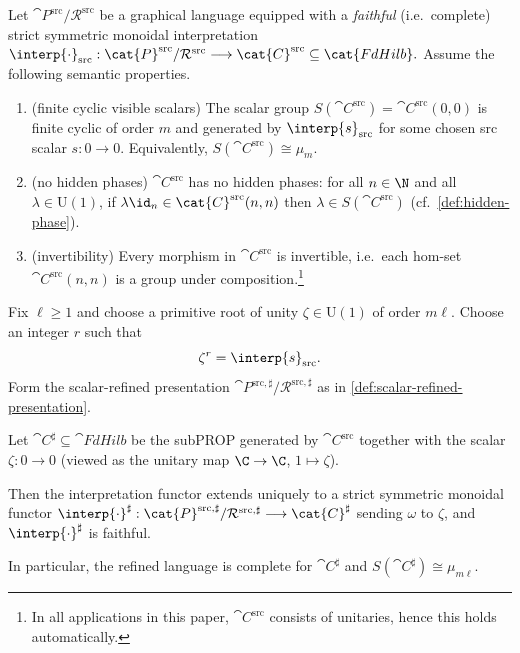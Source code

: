 \begin{lemma}\label{lem:scalar-refinement}
Let $\cat{P}^{\mathrm{src}}/\mathcal{R}^{\mathrm{src}}$ be a graphical language equipped with a
\emph{faithful} (i.e.\ complete) strict symmetric monoidal interpretation
\(
  \interp{\cdot}_{\mathrm{src}} :
  \cat{P}^{\mathrm{src}}/\mathcal{R}^{\mathrm{src}}
  \longrightarrow
   \cat{C}^{\mathrm{src}}
  \subseteq \cat{FdHilb}.
\)
Assume the following semantic properties.
\begin{enumerate}
\item\label{it:scalar-cyclic-app}
(finite cyclic visible scalars)
The scalar group $S( \cat{C}^{\mathrm{src}})= \cat{C}^{\mathrm{src}}(0,0)$ is finite cyclic of order $m$
and generated by $\interp{s}_{\mathrm{src}}$ for some chosen src scalar $s:0\to 0$.
Equivalently, $S( \cat{C}^{\mathrm{src}})\cong \mu_m$.

\item\label{it:no-hidden-phases-app}
(no hidden phases)
$ \cat{C}^{\mathrm{src}}$ has no hidden phases: for all $n\in\N$ and all $\lambda\in\mathrm{U}(1)$,
if $\lambda \id_n\in \cat{C}^{\mathrm{src}}(n,n)$ then $\lambda\in S( \cat{C}^{\mathrm{src}})$
(cf.\ \cref{def:hidden-phase}).

\item\label{it:invertible-app}
(invertibility)
Every morphism in $ \cat{C}^{\mathrm{src}}$ is invertible, i.e.\ each hom-set
$ \cat{C}^{\mathrm{src}}(n,n)$ is a group under composition.\footnote{%
In all applications in this paper, $ \cat{C}^{\mathrm{src}}$ consists of unitaries, hence this holds automatically.}
\end{enumerate}

Fix $\ell\ge 1$ and choose a primitive root of unity $\zeta\in\mathrm{U}(1)$ of order $m\ell$.
Choose an integer $r$ such that
\begin{equation}\label{eq:choose-r}
  \zeta^{r}=\interp{s}_{\mathrm{src}}.
\end{equation}
Form the scalar-refined presentation
$\cat{P}^{\mathrm{src},\sharp}/\mathcal{R}^{\mathrm{src},\sharp}$ as in
\cref{def:scalar-refined-presentation}.

Let $ \cat{C}^{\sharp}\subseteq\cat{FdHilb}$ be the subPROP generated by $ \cat{C}^{\mathrm{src}}$
together with the scalar $\zeta:0\to 0$ (viewed as the unitary map $\C\to\C$, $1\mapsto\zeta$).

Then the interpretation functor extends uniquely to a strict symmetric monoidal functor
\(
  \interp{\cdot}^{\sharp} :
  \cat{P}^{\mathrm{src},\sharp}/\mathcal{R}^{\mathrm{src},\sharp}
  \longrightarrow
   \cat{C}^{\sharp}
\)
sending $\omega$ to $\zeta$, and $\interp{\cdot}^{\sharp}$ is faithful.

In particular, the refined language is complete for $ \cat{C}^{\sharp}$ and
$S( \cat{C}^{\sharp})\cong \mu_{m\ell}$.
\end{lemma}

